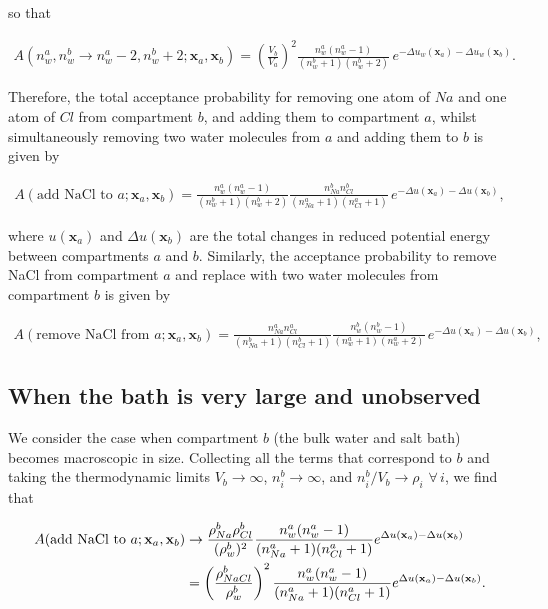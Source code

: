 \documentclass[11pt]{article} %
\begin{document}
so that

\begin{align}
A(n_w^a,n_w^b \rightarrow n_w^a - 2,n_w^b + 2;\mathbf{x}_a,\mathbf{x}_b) = \left(\frac{V_b}{V_a}\right)^2 \frac{n_w^a(n_w^a - 1)}{(n_w^b +1)(n_w^b +2)} \, e^{- \Delta u_w(\mathbf{x}_a)- \Delta u_w(\mathbf{x}_b)}.
\end{align}

Therefore, the total acceptance probability for removing one atom of $Na$ and one atom of $Cl$ from compartment $b$, and adding them to compartment $a$, whilst simultaneously removing two water molecules from $a$ and adding them to $b$ is given by

\begin{align}
A(\text{add NaCl to} \,\, a;\mathbf{x}_a,\mathbf{x}_b) =  \frac{n_w^a(n_w^a - 1)}{(n_w^b +1)(n_w^b +2)}\frac{n^b_{Na}n^b_{Cl}}{(n^a_{Na} + 1)(n^a_{Cl} + 1)} \, e^{- \Delta u(\mathbf{x}_a)- \Delta u(\mathbf{x}_b)},
\end{align}

where $u(\mathbf{x}_a)$ and $\Delta u(\mathbf{x}_b)$ are the total changes in reduced potential energy between compartments $a$ and $b$. Similarly, the acceptance probability to remove NaCl from compartment $a$ and replace with two water molecules from compartment $b$ is given by

\begin{align}
A(\text{remove NaCl from} \,\, a;\mathbf{x}_a,\mathbf{x}_b) =  \frac{n_{Na}^a n^a_{Cl}}{(n_{Na}^b +1)(n_{Cl}^b+1)}\frac{n^b_{w}(n^b_{w}-1)}{(n^a_{w} + 1)(n^a_{w} + 2)} \, e^{- \Delta u(\mathbf{x}_a)- \Delta u(\mathbf{x}_b)},
\end{align}


\subsection{When the bath is very large and unobserved}
We consider the case when compartment $b$ (the bulk water and salt bath) becomes macroscopic in size. Collecting all the terms that correspond to $b$ and taking the thermodynamic limits $V_b \rightarrow \infty$, $n_i^b \rightarrow \infty$, and $n^b_i/V_b \rightarrow \rho_i$ $\forall \, i$, we find that

\begin{align}
A(\text{add NaCl to} \,\, a;\mathbf{x}_a,\mathbf{x}_b) &\rightarrow \frac{\rho_{Na}^b \rho_{Cl}^b}{(\rho_w^b)^2}\frac{n_w^a(n_w^a - 1)}{(n^a_{Na} + 1)(n^a_{Cl} + 1)}e^{\Delta u(\mathbf{x}_a)- \Delta u(\mathbf{x}_b)} \notag\\
&=\left(\frac{\rho_{NaCl}^b}{\rho_w^b}\right)^2\frac{n_w^a(n_w^a - 1)}{(n^a_{Na} + 1)(n^a_{Cl} + 1)}e^{\Delta u(\mathbf{x}_a)- \Delta u(\mathbf{x}_b)}.
\end{align}
\end{document}
